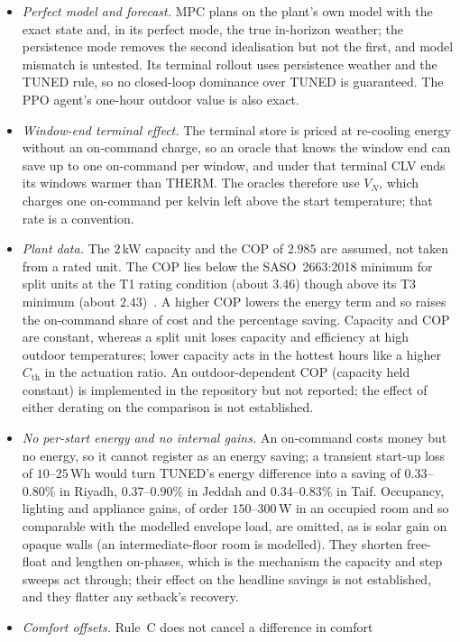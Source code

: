 \documentclass[3p,twocolumn,number]{elsarticle}
\newcommand{\Cth}{C_{\mathrm{th}}}
\begin{document}
\begin{itemize}[leftmargin=*,itemsep=1pt,topsep=2pt]
\item \emph{Perfect model and forecast.} MPC plans
on the plant's own model with the exact state and, in its perfect mode, the true in-horizon weather; the persistence mode removes the second idealisation but not the first, and model mismatch is untested. Its terminal rollout uses persistence weather and the TUNED rule, so no closed-loop dominance over TUNED is guaranteed. The PPO agent's one-hour outdoor value is also exact.
\item \emph{Window-end terminal effect.} The terminal store is priced at
re-cooling energy without an on-command charge, so an oracle that knows the window end can save up to one on-command per window, and under that terminal CLV ends its windows warmer than THERM. The oracles therefore use $V_N$, which charges one on-command per kelvin left above the start temperature; that rate is a convention.
\item \emph{Plant data.} The $2\,$kW capacity and the COP of $2.985$ are
assumed, not taken from a rated unit. The COP lies below the SASO~2663:2018 minimum for split units at the T1 rating condition (about $3.46$) though above its T3 minimum (about $2.43$)~\cite{SASO2663}. A higher COP lowers the energy term and so raises the on-command share of cost and the percentage saving. Capacity and COP are constant, whereas a split unit loses capacity and efficiency at high outdoor temperatures; lower capacity acts in the hottest hours like a higher $\Cth$ in the actuation ratio. An outdoor-dependent COP (capacity held constant) is implemented in the repository but not reported; the effect of either derating on the comparison is not established.
\item \emph{No per-start energy and no internal gains.} An on-command costs
money but no energy, so it cannot register as an energy saving; a transient start-up loss of $10$--$25\,$Wh would turn TUNED's energy difference into a saving of $0.33$--$0.80\%$ in Riyadh, $0.37$--$0.90\%$ in Jeddah and $0.34$--$0.83\%$ in Taif. Occupancy, lighting and appliance gains, of order $150$--$300\,$W in an occupied room and so comparable with the modelled envelope load, are omitted, as is solar gain on opaque walls (an intermediate-floor room is modelled). They shorten free-float and lengthen on-phases, which is the mechanism the capacity and step sweeps act through; their effect on the headline savings is not established, and they flatter any setback's recovery.
\item \emph{Comfort offsets.} Rule~C does not cancel a difference in comfort

\end{itemize}
\end{document}
